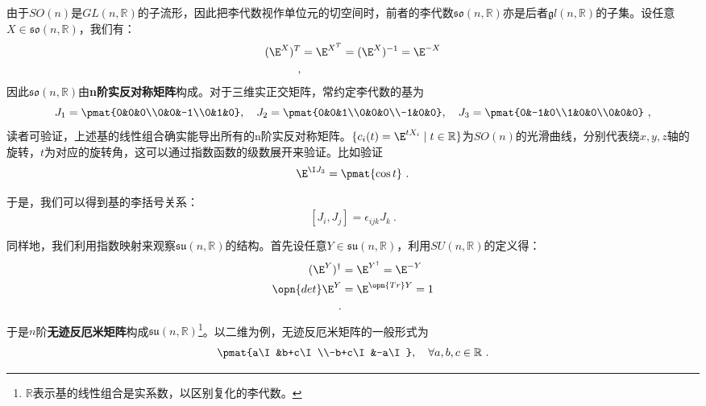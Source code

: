 由于$SO(n)$是$GL(n,\mathbb R)$的子流形，因此把李代数视作单位元的切空间时，前者的李代数$\mathfrak {so}(n,\mathbb R)$亦是后者$\mathfrak gl(n,\mathbb R)$的子集。设任意$X\in \mathfrak {so}(n,\mathbb R)$，我们有：
\begin{equation}
\begin{aligned}
(\E^{X})^T&=\E^{X^T}=(\E^{X})^{-1}=\E^{-X}\\
~,
\end{aligned}
\end{equation}
因此$\mathfrak {so}(n,\mathbb R)$由\textbf{n阶实反对称矩阵}构成。对于三维实正交矩阵，常约定李代数的基为
\begin{equation}J_1=\pmat{0&0&0\\0&0&-1\\0&1&0},\quad J_2=\pmat{0&0&1\\0&0&0\\-1&0&0},\quad J_3=\pmat{0&-1&0\\1&0&0\\0&0&0}~,\end{equation}
读者可验证，上述基的线性组合确实能导出所有的n阶实反对称矩阵。$\{c_i(t)=\E^{tX_i}\mid t\in \mathbb R\}$为$SO(n)$的光滑曲线，分别代表绕$x,y,z$轴的旋转，$t$为对应的旋转角，这可以通过指数函数的级数展开来验证。比如验证
\begin{equation}
\E^{\I J_3}=\pmat{\cos t}~.
\end{equation}


于是，我们可以得到基的李括号关系：
\begin{equation}\label{eq_LieGA_5}
[J_i,J_j]=\epsilon_{ijk}J_k~.
\end{equation}

同样地，我们利用指数映射来观察$\mathfrak {su}(n,\mathbb R)$的结构。首先设任意$Y\in \mathfrak {su}(n,\mathbb R)$，利用$SU(n,\mathbb R)$的定义得：
\begin{equation}
\begin{aligned}
(\E^Y)^{\dagger}&=\E^{Y^{\dagger}}=\E^{-Y}\\
\opn{det}\E^{Y}&=\E^{\opn{Tr}Y}=1\\
~.
\end{aligned}
\end{equation}
于是$n$阶\textbf{无迹}\textbf{反厄米矩阵}构成$\mathfrak {su}(n,\mathbb R)$\footnote{$\mathbb R$表示基的线性组合是实系数，以区别复化的李代数。}。以二维为例，无迹反厄米矩阵的一般形式为
\begin{equation}
\pmat{a\I&b+c\I\\-b+c\I&-a\I},\quad\forall a,b,c\in \mathbb R~.
\end{equation}

